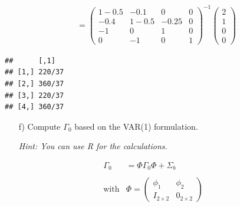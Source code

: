 \documentclass[12pt,a4paper]{article}
\newenvironment{Shaded}{\begin{snugshade}}{\end{snugshade}}
\newcommand{\CommentTok}[1]{\textcolor[rgb]{0.56,0.35,0.01}{\textit{#1}}}
\newcommand{\DecValTok}[1]{\textcolor[rgb]{0.00,0.00,0.81}{#1}}
\newcommand{\KeywordTok}[1]{\textcolor[rgb]{0.13,0.29,0.53}{\textbf{#1}}}
\newcommand{\NormalTok}[1]{#1}
\newcommand{\OperatorTok}[1]{\textcolor[rgb]{0.81,0.36,0.00}{\textbf{#1}}}
\newcommand{\StringTok}[1]{\textcolor[rgb]{0.31,0.60,0.02}{#1}}
\begin{document}
\begin{align*}
  & = \begin{pmatrix} 
  1-0.5 & -0.1 & 0 & 0 \\
  -0.4 & 1-0.5 & -0.25 & 0 \\
  -1 & 0 & 1 & 0 \\
  0 & -1 & 0 & 1 
  \end{pmatrix}^{-1}
  \begin{pmatrix} 
  2 \\ 1 \\ 0 \\ 0 
  \end{pmatrix}
\end{align*}

\begin{Shaded}
\end{Shaded}

\begin{verbatim}
##      [,1]  
## [1,] 220/37
## [2,] 360/37
## [3,] 220/37
## [4,] 360/37
\end{verbatim}

\begin{itemize}
    \item[f)] Compute $\Gamma_0$ based on the VAR(1) formulation.
    \item[] \textit{Hint: You can use R for the calculations.}
\end{itemize}

\begin{align*}
  \Gamma_0 & = \Phi \Gamma_0 \Phi + \Sigma_b \\
  \\
  \text{with} & \Phi = \begin{pmatrix} \phi_1 & \phi_2 \\
  I_{2 \times 2} & 0_{2 \times 2}
  \end{pmatrix}
  \end{align*}
\end{document}
